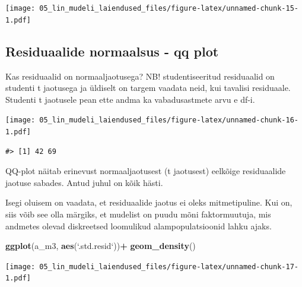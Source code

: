 \documentclass[]{book}
\newenvironment{Shaded}{\begin{snugshade}}{\end{snugshade}}
\newcommand{\DataTypeTok}[1]{\textcolor[rgb]{0.13,0.29,0.53}{#1}}
\newcommand{\DecValTok}[1]{\textcolor[rgb]{0.00,0.00,0.81}{#1}}
\newcommand{\KeywordTok}[1]{\textcolor[rgb]{0.13,0.29,0.53}{\textbf{#1}}}
\newcommand{\NormalTok}[1]{#1}
\newcommand{\OperatorTok}[1]{\textcolor[rgb]{0.81,0.36,0.00}{\textbf{#1}}}
\newcommand{\StringTok}[1]{\textcolor[rgb]{0.31,0.60,0.02}{#1}}
\begin{document}
\texttt{[image: 05\_lin\_mudeli\_laiendused\_files/figure-latex/unnamed-chunk-15-1.pdf]}

\hypertarget{residuaalide-normaalsus---qq-plot}{%
\subsection*{Residuaalide normaalsus - qq plot}\label{residuaalide-normaalsus---qq-plot}}

Kas residuaalid on normaaljaotusega? NB! studentiseeritud residuaalid on studenti t jaotusega ja üldiselt on targem vaadata neid, kui tavalisi residuaale. Studenti t jaotusele pean ette andma ka vabadusastmete arvu e df-i.

\begin{Shaded}
\end{Shaded}

\texttt{[image: 05\_lin\_mudeli\_laiendused\_files/figure-latex/unnamed-chunk-16-1.pdf]}

\begin{verbatim}
#> [1] 42 69
\end{verbatim}

QQ-plot näitab erinevust normaaljaotusest (t jaotusest) eelkõige residuaalide jaotuse sabades. Antud juhul on kõik hästi.

Isegi oluisem on vaadata, et residuaalide jaotus ei oleks mitmetipuline. Kui on, siis võib see olla märgiks, et mudelist on puudu mõni faktormuutuja, mis andmetes olevad diskreetsed loomulikud alampopulatsioonid lahku ajaks.

\begin{Shaded}
\begin{Highlighting}[]
\KeywordTok{ggplot}\NormalTok{(a_m3, }\KeywordTok{aes}\NormalTok{(}\StringTok{`}\DataTypeTok{.std.resid}\StringTok{`}\NormalTok{))}\OperatorTok{+}\StringTok{ }\KeywordTok{geom_density}\NormalTok{()}
\end{Highlighting}
\end{Shaded}

\texttt{[image: 05\_lin\_mudeli\_laiendused\_files/figure-latex/unnamed-chunk-17-1.pdf]}
\end{document}
